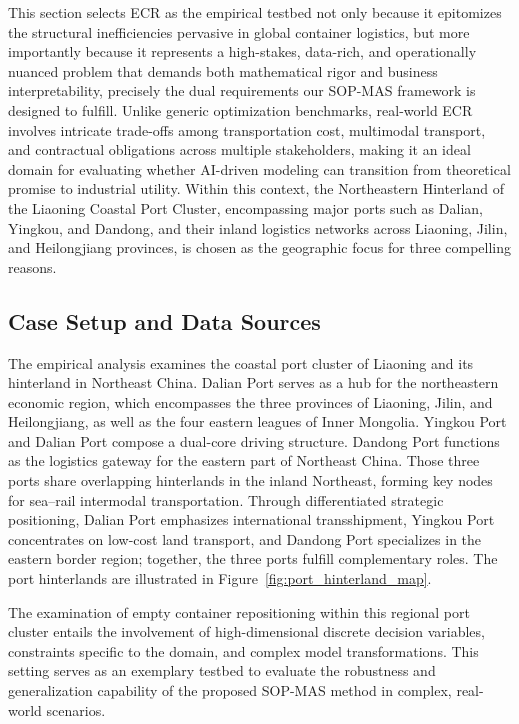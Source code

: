 \documentclass[preprint,12pt]{elsarticle}
\begin{document}
This section selects ECR as the empirical testbed not only because it epitomizes the structural inefficiencies pervasive in global container logistics, but more importantly because it represents a high-stakes, data-rich, and operationally nuanced problem that demands both mathematical rigor and business interpretability, precisely the dual requirements our SOP-MAS framework is designed to fulfill. Unlike generic optimization benchmarks, real-world ECR involves intricate trade-offs among transportation cost, multimodal transport, and contractual obligations across multiple stakeholders, making it an ideal domain for evaluating whether AI-driven modeling can transition from theoretical promise to industrial utility. Within this context, the Northeastern Hinterland of the Liaoning Coastal Port Cluster, encompassing major ports such as Dalian, Yingkou, and Dandong, and their inland logistics networks across Liaoning, Jilin, and Heilongjiang provinces, is chosen as the geographic focus for three compelling reasons.

\subsection{Case Setup and Data Sources}

The empirical analysis examines the coastal port cluster of Liaoning and its hinterland in Northeast China. Dalian Port serves as a hub for the northeastern economic region, which encompasses the three provinces of Liaoning, Jilin, and Heilongjiang, as well as the four eastern leagues of Inner Mongolia. Yingkou Port and Dalian Port compose a dual-core driving structure. Dandong Port functions as the logistics gateway for the eastern part of Northeast China. Those three ports share overlapping hinterlands in the inland Northeast, forming key nodes for sea–rail intermodal transportation. Through differentiated strategic positioning, Dalian Port emphasizes international transshipment, Yingkou Port concentrates on low-cost land transport, and Dandong Port specializes in the eastern border region; together, the three ports fulfill complementary roles. The port hinterlands are illustrated in Figure~\ref{fig:port_hinterland_map}.


The examination of empty container repositioning within this regional port cluster entails the involvement of high-dimensional discrete decision variables, constraints specific to the domain, and complex model transformations. This setting serves as an exemplary testbed to evaluate the robustness and generalization capability of the proposed SOP-MAS method in complex, real-world scenarios.
\end{document}
